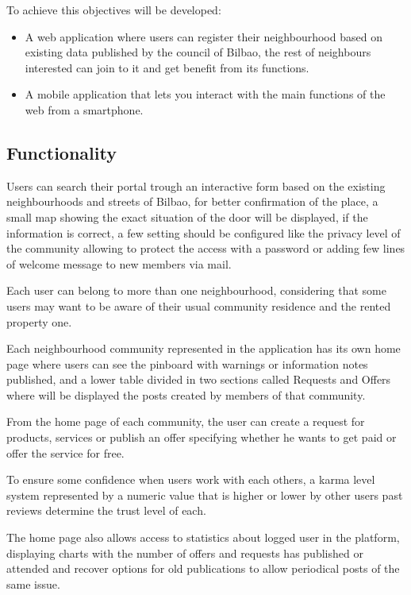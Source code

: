 \documentclass{DeustoFDP}
\begin{document}
To achieve this objectives will be developed:
\begin{itemize}
	\item A web application where users can register their neighbourhood based on existing data published by the council of Bilbao, the rest of neighbours interested can join to it and get benefit from its functions.
	
	\item A mobile application that lets you interact with the main functions of the web from a smartphone.
\end{itemize}

\subsection{Functionality}
Users can search their portal trough an interactive form based on the existing neighbourhoods and streets of Bilbao, for better confirmation of the place, a small map showing the exact situation of the door will be displayed, if the information is correct, a few setting should be configured like the privacy level of the community allowing to protect the access with a password or adding few lines of welcome message to new members via mail.

Each user can belong to more than one neighbourhood, considering that some users may want to be aware of their usual community residence and the rented property one.

Each neighbourhood community represented in the application has its own home page where users can see the pinboard with warnings or information notes published, and a lower table divided in two sections called Requests and Offers where will be displayed the posts created by members of that community.

From the home page of each community, the user can create a request for products, services or publish an offer specifying whether he wants to get paid or offer the service for free.

To ensure some confidence when users work with each others, a karma level system represented by a numeric value that is higher or lower by other users past reviews determine the trust level of each.

The home page also allows access to statistics about logged user in the platform, displaying charts with the number of offers and requests has published or attended and recover options for old publications to allow periodical posts of the same issue.
\end{document}
